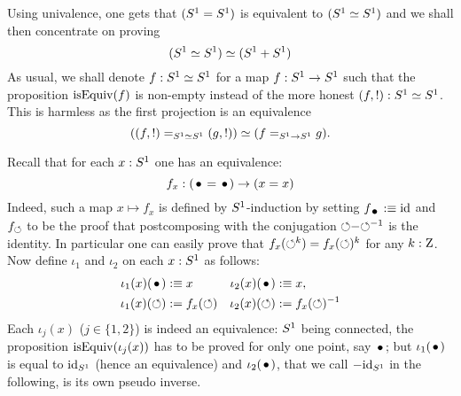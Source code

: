\documentclass[english,a4]{article}
\begin{document}
Using univalence, one gets that $({S^1} = {S^1})$ is
equivalent to $({S^1} \simeq {S^1})$ and we shall then concentrate on
proving
\begin{equation}
  ({S^1} \simeq {S^1}) \simeq ({S^1}+{S^1})
\end{equation}
As usual, we shall denote $f:{S^1}\simeq{S^1}$ for a map $f:{S^1}\to {S^1} $
such that the proposition $\mathrm{isEquiv}(f)$ is non-empty instead of the more
honest $(f,!):{S^1} \simeq {S^1}$. 
This is harmless as the first projection is an equivalence
\begin{equation}
  ((f,!) =_{{S^1} \simeq {S^1}} (g,!)) \simeq (f=_{{S^1} \to {S^1}}g).
\end{equation}

Recall that for each $x:{S^1}$ one has an equivalence:
\begin{equation}
  \label{eq:8}
  f_x : (\base = \base) \to (x=x)
\end{equation}
Indeed, such a map $x\mapsto f_x$ is defined by ${S^1}$-induction by
setting $f_{\base} \defequi \id$ and $f_{\mathord{\circlearrowleft}}$ to be the proof that
postcomposing with the conjugation $\mathord{\circlearrowleft} \mathord{-} {\mathord{\circlearrowleft}}^{-1}$ is the
identity. In particular one can easily prove that
$f_x(\mathord{\circlearrowleft}^k) = f_x(\mathord{\circlearrowleft})^k$ for any $k:\mathrm{Z}$. Now define $\iota_1$
and $\iota_2$ on each $x:{S^1}$ as follows:
\begin{align*}
  \iota_1(x) (\base) &\defequi x & \iota_2(x) (\base) &\defequi x,
  \\
  \iota_1(x)(\Sloop) &\defis f_x(\Sloop) &  \iota_2(x)(\Sloop) &\defis f_x(\Sloop)^{-1}
\end{align*}
Each $\iota_j(x)$ ($j\in\{1,2\}$) is indeed an equivalence: ${S^1}$
being connected, the proposition $\mathrm{isEquiv}(\iota_j(x))$ has to be proved
for only one point, say $\base$; but $\iota_1(\base)$ is equal to
$\mathord{\mathrm{id}}_{S^1}$ (hence an equivalence) and $\iota_2(\base)$, that we call
$-\mathord{\mathrm{id}}_{S^1}$ in the following, is its own pseudo inverse.
\end{document}
